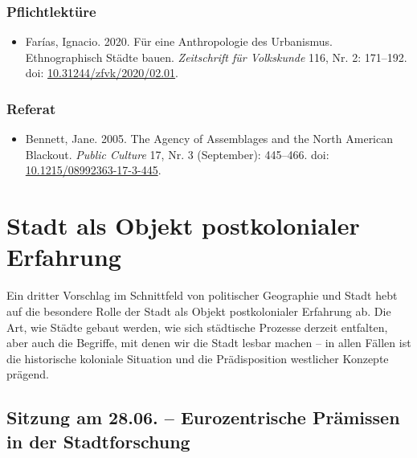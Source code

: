 \documentclass[
  ngerman,
]{article}
\providecommand{\tightlist}{%
  \setlength{\itemsep}{0pt}\setlength{\parskip}{0pt}}
\begin{document}
\hypertarget{pflichtlektuxfcre-8}{%
\subsubsection*{Pflichtlektüre}\label{pflichtlektuxfcre-8}}

\begin{itemize}
\tightlist
\item
  Farías, Ignacio. 2020. Für eine Anthropologie des Urbanismus. Ethnographisch Städte bauen. \emph{Zeitschrift für Volkskunde} 116, Nr. 2: 171--192. doi: \href{https://doi.org/10.31244/zfvk/2020/02.01}{10.31244/zfvk/2020/02.01}.
\end{itemize}

\hypertarget{referat-8}{%
\subsubsection*{Referat}\label{referat-8}}

\begin{itemize}
\tightlist
\item
  Bennett, Jane. 2005. The Agency of Assemblages and the North American Blackout. \emph{Public Culture} 17, Nr. 3 (September): 445--466. doi: \href{https://doi.org/10.1215/08992363-17-3-445}{10.1215/08992363-17-3-445}.
\end{itemize}

\pagebreak

\hypertarget{stadt-als-objekt-postkolonialer-erfahrung}{%
\section{Stadt als Objekt postkolonialer Erfahrung}\label{stadt-als-objekt-postkolonialer-erfahrung}}

Ein dritter Vorschlag im Schnittfeld von politischer Geographie und Stadt hebt auf die besondere Rolle der Stadt als Objekt postkolonialer Erfahrung ab. Die Art, wie Städte gebaut werden, wie sich städtische Prozesse derzeit entfalten, aber auch die Begriffe, mit denen wir die Stadt lesbar machen -- in allen Fällen ist die historische koloniale Situation und die Prädisposition westlicher Konzepte prägend.

\hypertarget{sitzung-am-28.06.-eurozentrische-pruxe4missen-in-der-stadtforschung}{%
\subsection{Sitzung am 28.06. -- Eurozentrische Prämissen in der Stadtforschung}\label{sitzung-am-28.06.-eurozentrische-pruxe4missen-in-der-stadtforschung}}
\end{document}
